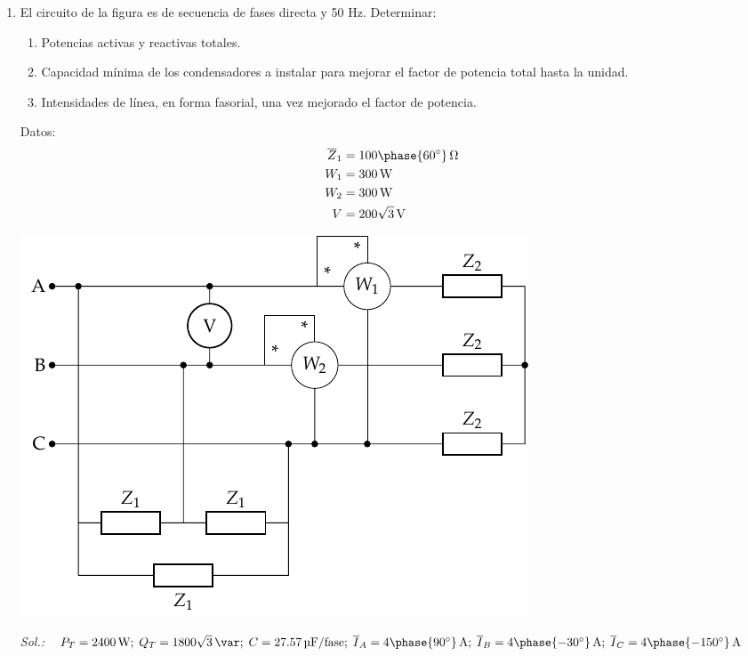\begin{enumerate}
 
\item El circuito de la figura es de secuencia de fases directa y 50
  Hz. Determinar:
  \begin{enumerate}
  \item Potencias activas y reactivas totales.
  \item Capacidad mínima de los condensadores a instalar para mejorar
    el factor de potencia total hasta la unidad.
  \item Intensidades de línea, en forma fasorial, una vez mejorado el
    factor de potencia.
  \end{enumerate}
  \begin{minipage}{0.4\linewidth}

    \vspace{-25mm}
    Datos:
    \begin{align*}
      \overline{Z}_1 &= {100\phase{\ang{60}}}\,\unit{\ohm}\\
      W_1 &= \SI{300}{\watt}\\
      W_2 &= \SI{300}{\watt}\\
      V &= {200\sqrt{3}}\,\unit{\volt}
    \end{align*}
  \end{minipage}
  \begin{minipage}{0.6\linewidth}
    \begin{center}
      \includegraphics[width=.97\linewidth]{../figs/ZyZt}
    \end{center}
  \end{minipage}
  
  \emph{Sol.:\;
  $P_T = \qty{2400}{\watt};\; 
  Q_T =1800\sqrt{3}\,\si{\var};\; 
  C=\qty{27.57}{\micro\farad}/\mathrm{fase};\;
  \overline{I}_A = {4\phase{{90^\circ}}}\,\si{\ampere};\;
  \overline{I}_B = {4\phase{{-30^\circ}}}\,\si{\ampere};\;
  \overline{I}_C = {4\phase{{-150^\circ}}}\,\si{\ampere}$}


\end{enumerate}
